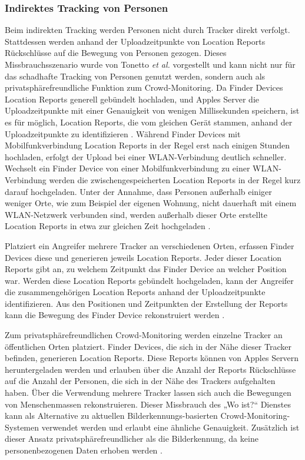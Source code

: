 \subsubsection{Indirektes Tracking von Personen}
Beim indirekten Tracking werden Personen nicht durch Tracker direkt verfolgt.
Stattdessen werden anhand der Uploadzeitpunkte von Location Reports Rückschlüsse auf die Bewegung von Personen gezogen.
Dieses Missbrauchsszenario wurde von Tonetto \textit{et al.} \cite{Tonetto_FindMy} vorgestellt und kann nicht nur für das schadhafte Tracking von Personen genutzt werden, sondern auch als privatsphärefreundliche Funktion zum Crowd-Monitoring.
Da Finder Devices Location Reports generell gebündelt hochladen, und Apples Server die Uploadzeitpunkte mit einer Genauigkeit von wenigen Millisekunden speichern, ist es für möglich, Location Reports, die vom gleichen Gerät stammen, anhand der Uploadzeitpunkte zu identifizieren \cite{Tonetto_FindMy}.
Während Finder Devices mit Mobilfunkverbindung Location Reports in der Regel erst nach einigen Stunden hochladen, erfolgt der Upload bei einer \ac{WLAN}-Verbindung deutlich schneller.
Wechselt ein Finder Device von einer Mobilfunkverbindung zu einer \ac{WLAN}-Verbindung werden die zwischengespeicherten Location Reports in der Regel kurz darauf hochgeladen.
Unter der Annahme, dass Personen außerhalb einiger weniger Orte, wie zum Beispiel der eigenen Wohnung, nicht dauerhaft mit einem \ac{WLAN}-Netzwerk verbunden sind, werden außerhalb dieser Orte erstellte Location Reports in etwa zur gleichen Zeit hochgeladen \cite{Tonetto_FindMy}.

Platziert ein Angreifer mehrere Tracker an verschiedenen Orten, erfassen Finder Devices diese und generieren jeweils Location Reports.
Jeder dieser Location Reports gibt an, zu welchem Zeitpunkt das Finder Device an welcher Position war.
Werden diese Location Reports gebündelt hochgeladen, kann der Angreifer die zusammengehörigen Location Reports anhand der Uploadzeitpunkte identifizieren.
Aus den Positionen und Zeitpunkten der Erstellung der Reports kann die Bewegung des Finder Device rekonstruiert werden \cite{Tonetto_FindMy}.


Zum privatsphärefreundlichen Crowd-Monitoring werden einzelne Tracker an öffentlichen Orten platziert.
Finder Devices, die sich in der Nähe dieser Tracker befinden, generieren Location Reports.
Diese Reports können von Apples Servern heruntergeladen werden und erlauben über die Anzahl der Reports Rückschlüsse auf die Anzahl der Personen, die sich in der Nähe des Trackers aufgehalten haben.
Über die Verwendung mehrere Tracker lassen sich auch die Bewegungen von Menschenmassen rekonstruieren.
Dieser Missbrauch des „Wo ist?“ Dienstes kann als Alternative zu aktuellen Bilderkennungs-basierten Crowd-Monitoring-Systemen verwendet werden und erlaubt eine ähnliche Genauigkeit.
Zusätzlich ist dieser Ansatz privatsphärefreundlicher als die Bilderkennung, da keine personenbezogenen Daten erhoben werden \cite{Tonetto_FindMy}.



